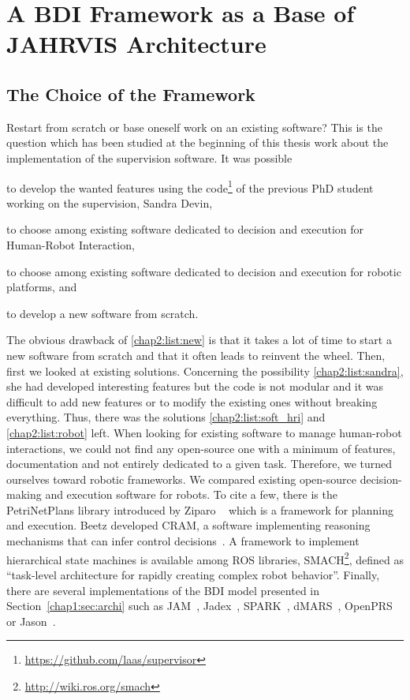 \documentclass[a4paper,11pt,twoside]{StyleThese}
\begin{document}
\section{A BDI Framework as a Base of JAHRVIS Architecture}\label{chap2:sec:bdi}


\subsection{The Choice of the Framework}
Restart from scratch or base oneself work on an existing software? This is the question which has been studied at the beginning of this thesis work about the implementation of the supervision software. It was possible 
\begin{enumerate*}[label={(\arabic*)}]
	\item to develop the wanted features using the code\footnote{\url{https://github.com/laas/supervisor}} of the previous PhD student working on the supervision, Sandra Devin,\label{chap2:list:sandra}
	\item to choose among existing software dedicated to decision and execution for Human-Robot Interaction,\label{chap2:list:soft_hri}
	\item to choose among existing software dedicated to decision and execution for robotic platforms, and\label{chap2:list:robot}
	\item to develop a new software from scratch.\label{chap2:list:new}
\end{enumerate*}

The obvious drawback of \ref{chap2:list:new} is that it takes a lot of time to start a new software from scratch and that it often leads to reinvent the wheel. Then, first we looked at existing solutions. Concerning the possibility \ref{chap2:list:sandra}, she had developed interesting features but the code is not modular and it was difficult to add new features or to modify the existing ones without breaking everything. Thus, there was the solutions \ref{chap2:list:soft_hri} and \ref{chap2:list:robot} left. When looking for existing software to manage human-robot interactions, we could not find any open-source one with a minimum of features, documentation and not entirely dedicated to a given task. Therefore, we turned ourselves toward robotic frameworks. We compared existing open-source decision-making and execution software for robots. To cite a few, there is the PetriNetPlans library introduced by Ziparo \etal~\cite{ziparo_2011_petri} which is a framework for planning and execution. Beetz \etal{} developed CRAM, a software implementing reasoning mechanisms that can infer control decisions~\cite{beetz_2010_cram}. A framework to implement hierarchical state machines is available among ROS libraries, SMACH\footnote{\url{http://wiki.ros.org/smach}}, defined as ``task-level architecture for rapidly creating complex robot behavior''. Finally, there are several implementations of the BDI model presented in Section~\ref{chap1:sec:archi} such as JAM~\cite{huber_1999_jam}, Jadex~\cite{braudach_2005_jadex}, SPARK~\cite{morley_2004_spark}, dMARS~\cite{dinverno_1998_formal}, OpenPRS~\cite{ingrand_1996_prs} or Jason~\cite{bordini_2007_jason}. 
\end{document}
